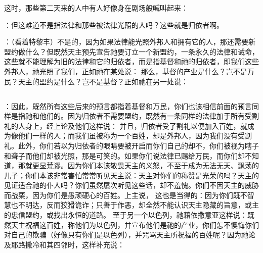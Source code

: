 这时，那些第二天来的人中有人好像身在剧场般喊叫起来：\par

：但这难道不是指法律和那些被法律光照的人吗？这些就是归依者啊。\par

：（看着特黎丰）不是的，因为如果法律能光照外邦人和拥有它的人，那还需要新盟约做什么？但既然天主预先宣告祂要订立一个新盟约，一条永久的法律和诫命，这些就不能理解为旧的法律和它的归依者，而是指基督和祂的归依者，即我们这些外邦人，祂光照了我们，正如祂在某处说： 那么，基督的产业是什么？岂不是万民？天主的盟约是什么？岂不是基督？正如祂在另一处说：\par


\subsection{}

：因此，既然所有这些后来的预言都指着基督和万民，你们也该相信前面的预言同样是指祂和他们的。因为归依者不需要盟约，既然有一条同样的法律加于所有受割礼的人身上，经上论及他们这样说： 并且，归依者受了割礼以便加入百姓，就成为像他们一样的人；而我们虽被称为一个百姓，却是外邦人，因为我们没有受割礼。此外，你们若以为归依者的眼睛要被开启而你们自己的却不，你们被视为瞎子和聋子而他们却被光照，那是可笑的。如果你们说法律已赐给万民，而你们却不知道，那就更显荒谬。因为你们本该敬畏天主的义怒，不至于成为无法无天、飘荡的儿子；你们本该非常害怕常常听见天主说：天主对你们的称赞是光荣的吗？天主的见证适合祂的仆人吗？你们虽然屡次听见这些话，却不羞愧。你们不因天主的威胁而战栗，因为你们是愚顽硬心的百姓。上主说， 这也是当得的：因为你们既不智慧也不明达，反而狡猾诡诈；只善于作恶，却全然不能认识天主隐藏的旨意，或主的忠信盟约，或找出永恒的道路。 至于另一个以色列，祂藉依撒意亚这样说：既然天主祝福这百姓，称他们为以色列，并宣布他们是祂的产业，你们怎不懊悔你们对自己的欺骗（好像只有你们是以色列），并咒骂天主所祝福的百姓呢？因为祂论及耶路撒冷和其四邻时，这样补充说：\par

